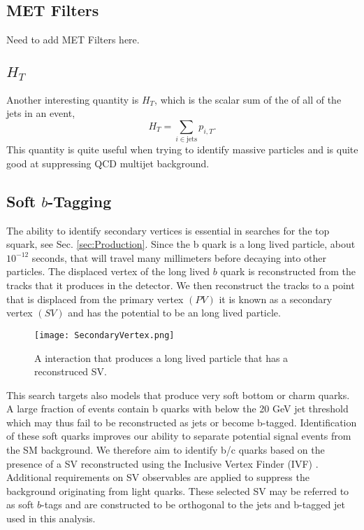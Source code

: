 \subsection{MET Filters}
Need to add MET Filters here.

\subsection{$H_T$}\label{HT}
Another interesting quantity is $H_T$, which is the scalar sum of the \pt of all of the jets in an event,
\begin{equation}
H_T=\sum_{i\in\text{jets}}p_{i,T}.
\end{equation}
This quantity is quite useful when trying to identify massive particles and is quite good at suppressing QCD multijet background.

\subsection{Soft $b$-Tagging}\label{SV}

The ability to identify secondary vertices is essential in searches for the top squark, see Sec. \ref{sec:Production}. Since the b quark is a long lived particle, about $10^{-12}$ seconds, that will travel many millimeters before decaying into other particles. The displaced vertex of the long lived $b$ quark is reconstructed from the tracks that it produces in the detector. We then reconstruct the tracks to a point that is displaced from the primary vertex $(PV)$ it is known as a secondary vertex $(SV)$ and has the potential to be an long lived particle. 

\begin{figure}
 	\centering
	\texttt{[image: SecondaryVertex.png]}
 	\caption[Secondary Vertex Diagram]{A interaction that produces a long lived particle that has a reconstruced SV.}
 	\label{SecondaryVertex} 
\end{figure}

This search targets also models that produce very soft bottom or charm quarks. A large fraction of events contain b quarks with \pt{} below the 20 GeV jet \pt{} threshold which may thus fail to be reconstructed as jets or become b-tagged. Identification of these soft quarks improves our ability to separate potential signal events from the SM background. We therefore aim to identify b/c quarks based on the presence of a SV reconstructed using the Inclusive Vertex Finder (IVF) \cite{noauthor_inclusivesecondaryvertexfinder_nodate}. Additional requirements on SV observables are applied to suppress the background originating from light quarks. These selected SV may be referred to as soft $b$-tags and are constructed to be orthogonal to the jets and b-tagged jet used in this analysis. 

